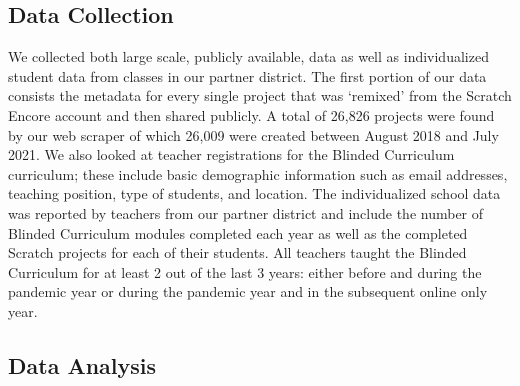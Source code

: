\documentclass[sigconf,manuscript,review,anonymous]{acmart} %
\newcommand{\Scratchencore}[0]{Blinded Curriculum}
\begin{document}
\subsection{Data Collection}
We collected both large scale, publicly available, data as well as individualized student data from
classes in our partner district. The first portion of our data consists the metadata for every
 single project that was `remixed' from the Scratch Encore account and then shared publicly.
 A total of 26,826 projects were found by our web scraper of which 26,009 were created
 between August 2018 and July 2021. We also looked at teacher registrations for the 
 \Scratchencore{} curriculum; these include basic demographic information such as email
 addresses, teaching position, type of students, and location. The individualized school data
 was reported by teachers from our partner district and include the number of \Scratchencore{}
 modules completed each year as well as the completed Scratch projects for each of their
 students. All teachers taught the \Scratchencore{} for at least 2 out of the last 3 years: either
 before and during the pandemic year or during the pandemic year and in the subsequent
 online only year.

\subsection{Data Analysis}
\end{document}
